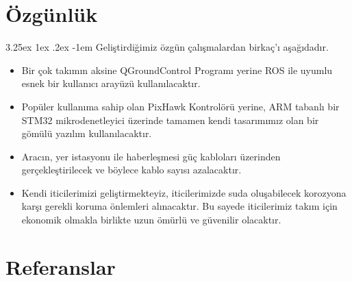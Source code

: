 \documentclass[12pt]{article}
\makeatletter
\renewcommand\paragraph{\@startsection{paragraph}{5}{\z@}%
  {3.25ex \@plus1ex \@minus.2ex}%
  {-1em}%
  {\normalfont\normalsize\bfseries}}
\makeatother
\begin{document}
\section{Özgünlük}

\paragraph{} Geliştirdiğimiz özgün çalışmalardan birkaç'ı aşağıdadır.
\begin{itemize}
    \item Bir çok takımın aksine QGroundControl Programı yerine ROS ile uyumlu esnek bir kullanıcı arayüzü kullanılacaktır.
    
    \item Popüler kullanıma sahip olan PixHawk Kontrolörü yerine, ARM tabanlı bir STM32 mikrodenetleyici üzerinde tamamen kendi tasarımımız olan bir gömülü yazılım kullanılacaktır.
    \item Aracın, yer istasyonu ile haberleşmesi güç kabloları üzerinden gerçekleştirilecek ve böylece kablo sayısı azalacaktır.
    
    \item Kendi iticilerimizi geliştirmekteyiz, iticilerimizde suda oluşabilecek korozyona karşı gerekli koruma önlemleri alınacaktır. Bu sayede iticilerimiz takım için ekonomik olmakla birlikte uzun ömürlü ve güvenilir olacaktır. 
\end{itemize}

\newpage
\section{Referanslar}
\vspace{-1cm}
\printbibliography[title={\textbf{ }}]
\end{document}
